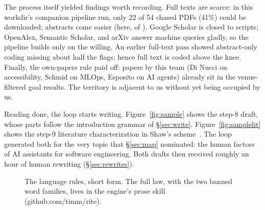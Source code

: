 The process itself yielded findings worth recording.
Full texts are scarce: in this workdir's companion pipeline run, only
22 of 54 chased PDFs (41\%) could be downloaded; abstracts come easier
(here, \litAbs{} of \litKnee).
Google Scholar is closed to scripts; OpenAlex, Semantic Scholar, and
arXiv answer machine queries gladly, so the pipeline builds only on
the willing.
An earlier full-text pass showed abstract-only coding missing about
half the flags; hence full text is coded above the knee.
Finally, the own-papers rule paid off: \litOwn{} papers by this team
(Di Nucci on accessibility, Schmid on MLOps, Esposito on AI agents)
already sit in the venue-filtered goal results.
The territory is adjacent to us without yet being occupied by us.

Reading done, the loop starts writing.
Figure~\ref{fig:sample} shows the step-8 draft, whose parts follow
the introduction grammar of \S\ref{sec:write}.
Figure~\ref{fig:samplelit} shows the step-9 literature
characterization in Shaw's scheme~\cite{shaw03}.
The loop generated both for the very topic that \S\ref{sec:map}
nominated: the human factors of AI assistants for software
engineering.
Both drafts then received roughly an hour of human rewriting
(\S\ref{sec:rewrites}).

\begin{figure}[t]
\caption{The language rules, short form.
The full law, with the two banned word families, lives in the
engine's prose skill (github.com/timm/rite).}
\label{fig:language}
\end{figure}

